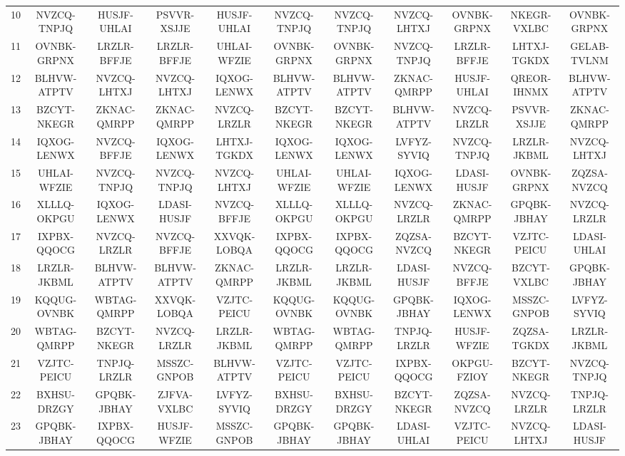 \begin{landscape}
{\begin{longtable}{ccccccccccc}
10 &  NVZCQ-TNPJQ &  HUSJF-UHLAI &  PSVVR-XSJJE &  HUSJF-UHLAI &  NVZCQ-TNPJQ &  NVZCQ-TNPJQ &  NVZCQ-LHTXJ &  OVNBK-GRPNX &  NKEGR-VXLBC &  OVNBK-GRPNX \\
11 &  OVNBK-GRPNX &  LRZLR-BFFJE &  LRZLR-BFFJE &  UHLAI-WFZIE &  OVNBK-GRPNX &  OVNBK-GRPNX &  NVZCQ-TNPJQ &  LRZLR-BFFJE &  LHTXJ-TGKDX &  GELAB-TVLNM \\
12 &  BLHVW-ATPTV &  NVZCQ-LHTXJ &  NVZCQ-LHTXJ &  IQXOG-LENWX &  BLHVW-ATPTV &  BLHVW-ATPTV &  ZKNAC-QMRPP &  HUSJF-UHLAI &  QREOR-IHNMX &  BLHVW-ATPTV \\
13 &  BZCYT-NKEGR &  ZKNAC-QMRPP &  ZKNAC-QMRPP &  NVZCQ-LRZLR &  BZCYT-NKEGR &  BZCYT-NKEGR &  BLHVW-ATPTV &  NVZCQ-LRZLR &  PSVVR-XSJJE &  ZKNAC-QMRPP \\
14 &  IQXOG-LENWX &  NVZCQ-BFFJE &  IQXOG-LENWX &  LHTXJ-TGKDX &  IQXOG-LENWX &  IQXOG-LENWX &  LVFYZ-SYVIQ &  NVZCQ-TNPJQ &  LRZLR-JKBML &  NVZCQ-LHTXJ \\
15 &  UHLAI-WFZIE &  NVZCQ-TNPJQ &  NVZCQ-TNPJQ &  NVZCQ-LHTXJ &  UHLAI-WFZIE &  UHLAI-WFZIE &  IQXOG-LENWX &  LDASI-HUSJF &  OVNBK-GRPNX &  ZQZSA-NVZCQ \\
16 &  XLLLQ-OKPGU &  IQXOG-LENWX &  LDASI-HUSJF &  NVZCQ-BFFJE &  XLLLQ-OKPGU &  XLLLQ-OKPGU &  NVZCQ-LRZLR &  ZKNAC-QMRPP &  GPQBK-JBHAY &  NVZCQ-LRZLR \\
17 &  IXPBX-QQOCG &  NVZCQ-LRZLR &  NVZCQ-BFFJE &  XXVQK-LOBQA &  IXPBX-QQOCG &  IXPBX-QQOCG &  ZQZSA-NVZCQ &  BZCYT-NKEGR &  VZJTC-PEICU &  LDASI-UHLAI \\
18 &  LRZLR-JKBML &  BLHVW-ATPTV &  BLHVW-ATPTV &  ZKNAC-QMRPP &  LRZLR-JKBML &  LRZLR-JKBML &  LDASI-HUSJF &  NVZCQ-BFFJE &  BZCYT-VXLBC &  GPQBK-JBHAY \\
19 &  KQQUG-OVNBK &  WBTAG-QMRPP &  XXVQK-LOBQA &  VZJTC-PEICU &  KQQUG-OVNBK &  KQQUG-OVNBK &  GPQBK-JBHAY &  IQXOG-LENWX &  MSSZC-GNPOB &  LVFYZ-SYVIQ \\
20 &  WBTAG-QMRPP &  BZCYT-NKEGR &  NVZCQ-LRZLR &  LRZLR-JKBML &  WBTAG-QMRPP &  WBTAG-QMRPP &  TNPJQ-LRZLR &  HUSJF-WFZIE &  ZQZSA-TGKDX &  LRZLR-JKBML \\
21 &  VZJTC-PEICU &  TNPJQ-LRZLR &  MSSZC-GNPOB &  BLHVW-ATPTV &  VZJTC-PEICU &  VZJTC-PEICU &  IXPBX-QQOCG &  OKPGU-FZIOY &  BZCYT-NKEGR &  NVZCQ-TNPJQ \\
22 &  BXHSU-DRZGY &  GPQBK-JBHAY &  ZJFVA-VXLBC &  LVFYZ-SYVIQ &  BXHSU-DRZGY &  BXHSU-DRZGY &  BZCYT-NKEGR &  ZQZSA-NVZCQ &  NVZCQ-LRZLR &  TNPJQ-LRZLR \\
23 &  GPQBK-JBHAY &  IXPBX-QQOCG &  HUSJF-WFZIE &  MSSZC-GNPOB &  GPQBK-JBHAY &  GPQBK-JBHAY &  LDASI-UHLAI &  VZJTC-PEICU &  NVZCQ-LHTXJ &  LDASI-HUSJF \\

\end{longtable}}
\end{landscape}
